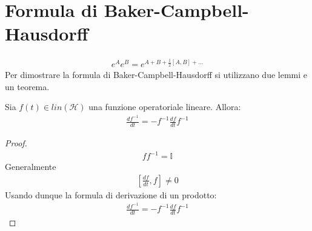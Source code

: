 


%

\section{Formula di Baker-Campbell-Hausdorff} %
\begin{equation*}\begin{split}
e^{A}e^{B}=e^{A+B+\frac{1}{2}\left[A,B\right]+...}
\end{split}\end{equation*}
Per dimostrare la formula di Baker-Campbell-Hausdorff si utilizzano due lemmi e un teorema.

\begin{lemma} %
Sia $f\left(t\right) \in lin\left(\mathcal{H}\right)$ una funzione operatoriale lineare. Allora:
\begin{equation*}\begin{split}
\frac{df^{-1}}{dt}=-f^{-1}\frac{df}{dt}f^{-1}
\end{split}\end{equation*}
\end{lemma}
\begin{proof}
\begin{equation*}\begin{split}
ff^{-1}=\mathbb{I}
\end{split}\end{equation*}
Generalmente
\begin{equation*}\begin{split}
\left[\frac{df}{dt},f\right]\neq 0
\end{split}\end{equation*}
Usando dunque la formula di derivazione di un prodotto:
\begin{equation*}\begin{split}
\frac{df^{-1}}{dt}=-f^{-1}\frac{df}{dt}f^{-1}
\end{split}\end{equation*}
\end{proof}

